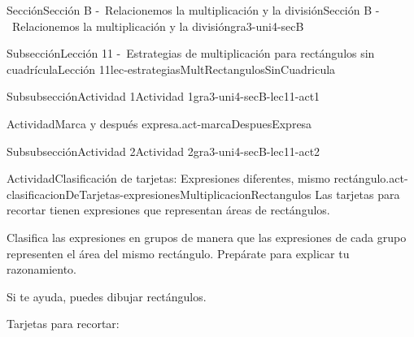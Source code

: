 \begin{sectionptx}{Sección}{Sección B -~Relacionemos la multiplicación y la división}{}{Sección B -~Relacionemos la multiplicación y la división}{}{}{gra3-uni4-secB}
\begin{subsectionptx}{Subsección}{Lección 11 -~Estrategias de multiplicación para rectángulos sin cuadrícula}{}{Lección 11}{}{}{lec-estrategiasMultRectangulosSinCuadricula}
\begin{subsubsectionptx}{Subsubsección}{Actividad 1}{}{Actividad 1}{}{}{gra3-uni4-secB-lec11-act1}
\begin{activity}{Actividad}{Marca y después expresa.}{act-marcaDespuesExpresa}
\begin{image}{0}{1}{0}{}
\end{image}%
\end{activity}%
\end{subsubsectionptx}
%
%
\typeout{************************************************}
\typeout{************************************************}
%
\begin{subsubsectionptx}{Subsubsección}{Actividad 2}{}{Actividad 2}{}{}{gra3-uni4-secB-lec11-act2}
\begin{activity}{Actividad}{Clasificación de tarjetas: Expresiones diferentes, mismo rectángulo.}{act-clasificacionDeTarjetas-expresionesMultiplicacionRectangulos}%
Las tarjetas para recortar tienen expresiones que representan áreas de rectángulos.%
\par
Clasifica las expresiones en grupos de manera que las expresiones de cada grupo representen el área del mismo rectángulo. Prepárate para explicar tu razonamiento.%
\par
Si te ayuda, puedes dibujar rectángulos.%
\end{activity}%
\begin{cutoutpage}
Tarjetas para recortar:
\begin{image}{0}{1}{0}{}%

\end{image}
\end{cutoutpage}
\end{subsubsectionptx}
\end{subsectionptx}
\end{sectionptx}

